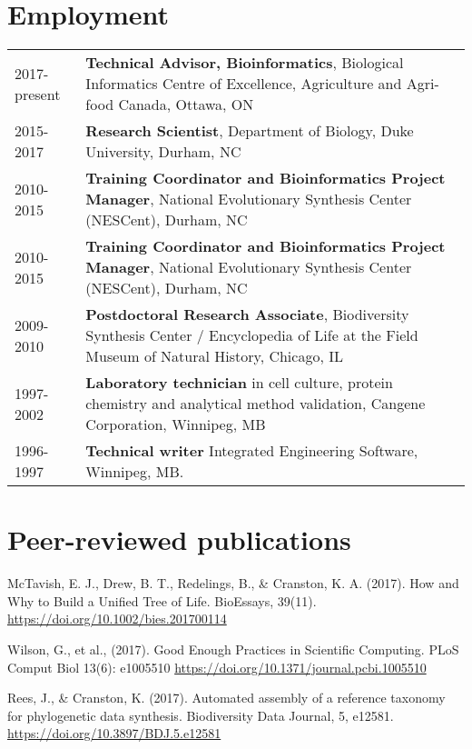 \documentclass[10pt]{article}
\begin{document}
\section*{Employment}
\begin{table}[h]
	\begin{tabular}{ p{2.0cm} p{12.4cm} }
		2017-present & \textbf{Technical Advisor, Bioinformatics}, Biological Informatics Centre of Excellence, Agriculture and Agri-food Canada, Ottawa, ON \\
		2015-2017 & \textbf{Research Scientist}, Department of Biology, Duke University, Durham, NC \\
		2010-2015 & \textbf{Training Coordinator and Bioinformatics Project Manager}, National Evolutionary Synthesis Center (NESCent), Durham, NC \\
		2010-2015 & \textbf{Training Coordinator and Bioinformatics Project Manager}, National Evolutionary Synthesis Center (NESCent), Durham, NC \\
		2009-2010 & \textbf{Postdoctoral Research Associate}, Biodiversity Synthesis Center / Encyclopedia of Life at the Field Museum of Natural History, Chicago, IL  \\
		1997-2002 & \textbf{Laboratory technician} in cell culture, protein chemistry and analytical method validation, Cangene Corporation, Winnipeg, MB  \\		
		1996-1997 & \textbf{Technical writer} Integrated Engineering Software, Winnipeg, MB.   \\		

	\end{tabular}
\end{table}


\section*{Peer-reviewed publications}

McTavish, E. J., Drew, B. T., Redelings, B., \& Cranston, K. A. (2017). How and Why to Build a Unified Tree of Life. BioEssays, 39(11). \url{https://doi.org/10.1002/bies.201700114}

Wilson, G., et al., (2017). Good Enough Practices in Scientific Computing. PLoS Comput Biol 13(6): e1005510 \url{https://doi.org/10.1371/journal.pcbi.1005510}

Rees, J., \& Cranston, K. (2017). Automated assembly of a reference taxonomy for phylogenetic data synthesis. Biodiversity Data Journal, 5, e12581. \url{https://doi.org/10.3897/BDJ.5.e12581}
\end{document}

